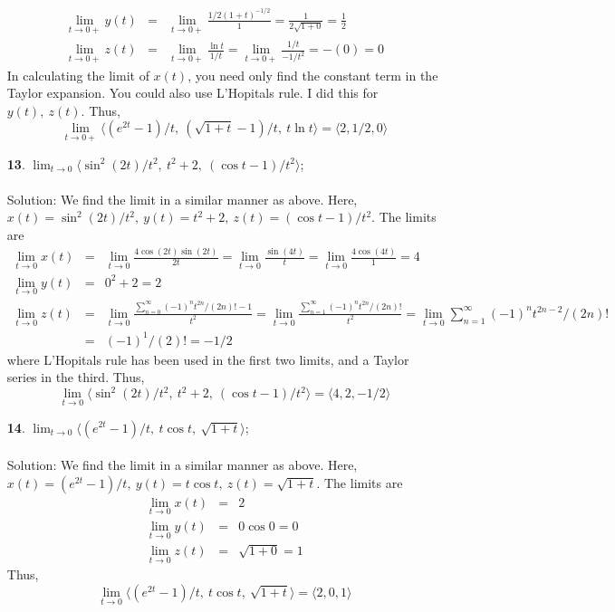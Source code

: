 \documentclass[12pt]{amsbook}
\newcommand{\la}{\langle}
\newcommand{\ra}{\rangle}
\begin{document}
\begin{enumerate}
\begin{eqnarray*}
\lim_{t\rightarrow 0+}y(t)&=&\lim_{t\rightarrow 0+}\frac{1/2(1+t)^{-1/2}}{1}=\frac{1}{2\sqrt{1+0}}=\frac{1}{2}\\
\lim_{t\rightarrow 0+}z(t)&=&\lim_{t\rightarrow 0+}\frac{\ln t}{1/t}=\lim_{t\rightarrow 0+}\frac{1/t}{-1/t^2}=-(0)=0
  \end{eqnarray*}
  In calculating the limit of $x(t)$, you need only find the constant term in the Taylor expansion. You could also use L'Hopitals rule. I did this for $y(t), \ z(t)$. 
  Thus, 
$$\lim_{t \rightarrow 0+}\la (e^{2t}-1)/t, \ (\sqrt{1+t}-1)/t, \ t\ln t \ra=\la 2,1/2,0\ra $$
  \item[{\small\bf 13}.] $\lim_{t \rightarrow 0}\la \sin^2(2t)/t^2, \ t^2+2, \ (\cos t-1)/t^2\ra$;
  \\
  \\
  {\sc Solution}: We find the limit in a similar manner as above. Here, $x(t)=\sin^2(2t)/t^2, \ y(t)=t^2+2, \ z(t)=(\cos t-1)/t^2$. The limits are 
    \begin{eqnarray*}
\lim_{t\rightarrow 0}x(t)&=&\lim_{t\rightarrow 0}\frac{4\cos(2t)\sin(2t)}{2t}=\lim_{t\rightarrow 0}\frac{\sin(4t)}{t}=\lim_{t\rightarrow 0}\frac{4\cos(4t)}{1}=4\\
\lim_{t\rightarrow 0}y(t)&=&0^2+2=2\\
\lim_{t\rightarrow 0}z(t)&=&\lim_{t\rightarrow 0}\frac{\sum_{n=0}^{\infty}(-1)^nt^{2n}/(2n)!-1}{t^2}=\lim_{t\rightarrow 0}\frac{\sum_{n=1}^{\infty}(-1)^nt^{2n}/(2n)!}{t^2}=\lim_{t\rightarrow 0}\sum_{n=1}^{\infty}(-1)^nt^{2n-2}/(2n)!\\
&=&(-1)^1/(2)!=-1/2
  \end{eqnarray*}
  where L'Hopitals rule has been used in the first two limits, and a Taylor series in the third.
  Thus, 
$$\lim_{t \rightarrow 0}\la \sin^2(2t)/t^2, \ t^2+2, \ (\cos t-1)/t^2\ra=\la 4,2,-1/2\ra $$
  \item[{\small\bf 14}.] $\lim_{t \rightarrow 0}\la (e^{2t}-1)/t, \ t\cos t, \ \sqrt{1+t}\ra$;
  \\
  \\
  {\sc Solution}: We find the limit in a similar manner as above. Here, $x(t)=(e^{2t}-1)/t, \ y(t)=t\cos t, \ z(t)=\sqrt{1+t}$. The limits are 
    \begin{eqnarray*}
\lim_{t\rightarrow 0}x(t)&=&2\\
\lim_{t\rightarrow 0}y(t)&=&0\cos 0=0\\
\lim_{t\rightarrow 0}z(t)&=&\sqrt{1+0}=1
  \end{eqnarray*}
  Thus, 
$$\lim_{t \rightarrow 0}\la (e^{2t}-1)/t, \ t\cos t, \ \sqrt{1+t}\ra=\la 2,0,1\ra $$

\end{enumerate}
\end{document}
